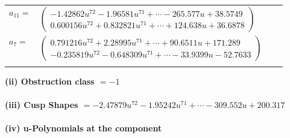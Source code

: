\documentclass[1p]{elsarticle_modified}
\theoremstyle{definition}
\begin{document}
\begin{tabular}{m{7pt} m{180pt} m{7pt} m{180pt} }
\flushright $a_{11}=$&$\begin{pmatrix}-1.42862 u^{72}-1.96581 u^{71}+\cdots-265.577 u+38.5749\\0.600156 u^{72}+0.832821 u^{71}+\cdots+124.638 u+36.6878\end{pmatrix}$ \\
\flushright $a_{7}=$&$\begin{pmatrix}0.791216 u^{72}+2.28995 u^{71}+\cdots+90.6511 u+171.289\\-0.235819 u^{72}-0.648309 u^{71}+\cdots-33.9399 u-52.7633\end{pmatrix}$\\&\end{tabular}
\flushleft \textbf{(ii) Obstruction class $= -1$}\\~\\
\flushleft \textbf{(iii) Cusp Shapes $= -2.47879 u^{72}-1.95242 u^{71}+\cdots-309.552 u+200.317$}\\~\\
\newpage\renewcommand{\arraystretch}{1}
\flushleft \textbf{(iv) u-Polynomials at the component}\newline \\
\end{document}

